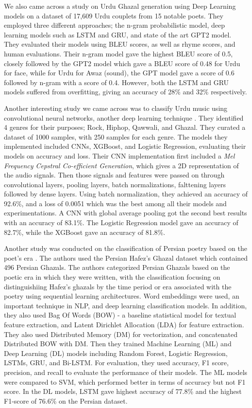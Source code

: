 We also came across a study on Urdu Ghazal generation using Deep Learning models \cite{sandypaper} on a dataset of 17,609 Urdu couplets from 15 notable poets. They employed three different approaches; the n-gram probabilistic model, deep learning models such as LSTM and GRU, and state of the art GPT2 model. They evaluated their models using BLEU scores, as well as rhyme scores, and human evaluations. Their n-gram model gave the highest BLEU score of 0.5, closely followed by the GPT2 model which gave a BLEU score of 0.48 for Urdu for face, while for Urdu for Awaz (sound), the GPT model gave a score of 0.6 followed by n-gram with a score of 0.4. However, both the LSTM and GRU models suffered from overfitting, giving an accuracy of 28\% and 32\% respectively.

Another interesting study we came across was to classify Urdu music using convolutional neural networks, another deep learning technique \cite{shayanshafaqmusicclassification}. They identified 4 genres for their purposes; Rock, Hiphop, Qawwali, and Ghazal. They curated a dataset of 1000 samples, with 250 samples for each genre. The models they implemented included CNNs, XGBoost, and Logistic Regression, evaluating their models on accuracy and loss. Their CNN implementation first included a \textit{Mel Frequency Cepstral Co-efficient Generation}, which gives a 2D representation of the audio signals. Then those signals and features were passed on through convolutional layers, pooling layers, batch normalizations, falttening layers followed by dense layers. Using batch normalization, they achieved an accuracy of 92.6\%, and a loss of 0.0051 which was the best among all their models and experimentations. A CNN with global average pooling got the second best results with an accuracy of 83.1\%. The Logistic Regression model gave an accuracy of 82.7\%, while the XGBoost gave an accuracy of 81.8\%.

Another study was conducted on the classification of Persian poetry based on the poet's era \cite{persian_poetry_classification}. The authors used the Persian Hafez's Ghazal dataset which contained 496 Persian Ghazals. The authors categorized Persian Ghazals based on the poetic era in which they were written, with the classification focusing on distinguishiing Hafez's ghazals by the time period or era associated with the poetry using sequential learning architectures. Word embeddings were used, an important technique in NLP, and deep learning classification models. In addition, they also used Bag Of Words (BOW) - a baseline statistical model for textual feature extraction, and Latent Dirichlet Allocation (LDA) for feature extraction. They also used Distributed Memory (DM) for vectorization, and concatenated Distributed BOW with DM. Then they trained Machine Learning (ML) and Deep Learning (DL) models including Random Forest, Logistic Regression, LSTMs, GRU, and Bi-LSTM. For evaluation, they used accuracy, F1 score, precision, and recall to evaluate the performance of their models. The ML models were compared to SVM, which performed better in terms of accuracy but not F1 score. In the DL models, LSTM gave highest accuracy of 77.8\% and the highest F1-score of 76.6\% on the Persian dataset.  

